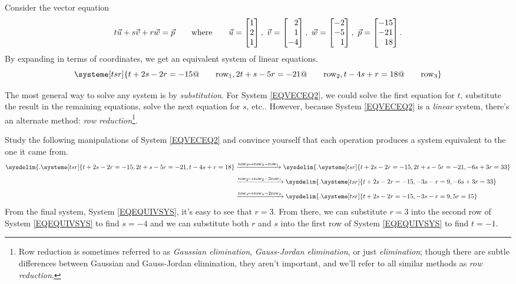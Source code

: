 
	Consider the vector equation
	\[
		t\vec u+s\vec v+r\vec w = \vec p\qquad\text{where}\qquad \vec u=\mat{1\\2\\1},\ 
		\vec v=\mat{2\\1\\-4},\ \vec w=\mat{-2\\-5\\1},\ \vec p=\mat{-15\\-21\\18}.
	\]
	By expanding in terms of coordinates, we get an equivalent system of linear equations.
	\begin{equation}
		\label{EQVECEQ2}
		\systeme[tsr]{
			t+2s-2r=-15@\qquad\text{row}_1,
			2t+s-5r=-21@\qquad\text{row}_2,
			t-4s+r=18@\qquad\text{row}_3
		}
	\end{equation}

	The most general way to solve any system is by \emph{substitution}. For System 
	\eqref{EQVECEQ2}, we could solve the first equation for $t$, substitute the result in
	the remaining equations, solve the next equation for $s$, etc.. However,
	because System \eqref{EQVECEQ2} is a \emph{linear} system, there's an alternate
	method: \emph{row reduction}\footnote{
	Row reduction is sometimes referred to as \emph{Gaussian elimination},
	\emph{Gauss-Jordan elimination}, or just \emph{elimination}; though there are subtle differences between Gaussian
	and Gauss-Jordan elimination,
	they aren't important, and we'll refer to all similar methods as \emph{row reduction}.}.

	Study the following manipulations of System \eqref{EQVECEQ2} and convince yourself
	that each operation produces a system equivalent to the one it came from.
	\begin{align}
	\sysdelim\{.
		\systeme[tsr]{
			t+2s-2r=-15,
			2t+s-5r=-21,
			t-4s+r=18
		}
		&\xrightarrow{\text{row}_3\mapsto\text{row}_3-\text{row}_1}
	\sysdelim\{.
		\systeme[tsr]{
			t+2s-2r=-15,
			2t+s-5r=-21,
			-6s+3r=33
		}\nonumber\\[4pt]
		&\xrightarrow{\text{row}_2\mapsto\text{row}_2-2\text{row}_1}
	\sysdelim\{.
		\systeme[tsr]{
			t+2s-2r=-15,
			-3s-r=9,
			-6s+3r=33
		}\nonumber\\[4pt]
		&\xrightarrow{\text{row}_3\mapsto\text{row}_3-2\text{row}_2}
	\sysdelim\{.
		\systeme[tsr]{
			t+2s-2r=-15,
			-3s-r=9,
			  5r=15
		}\label{EQEQUIVSYS}
	\end{align}
	From the final system, System \eqref{EQEQUIVSYS}, it's easy to see that $r=3$.
	From there,
	we can substitute $r=3$ into the second row of System \eqref{EQEQUIVSYS}
	to find $s=-4$ and we can substitute both $r$ and $s$ into the first row of System \eqref{EQEQUIVSYS}
	to find $t=-1$.

